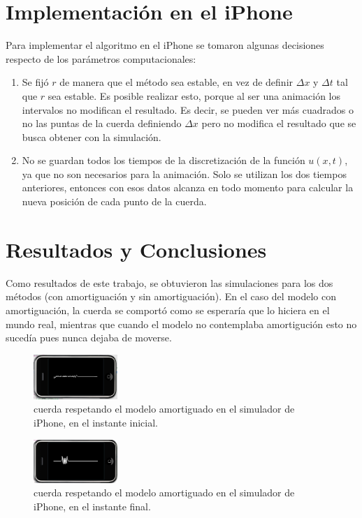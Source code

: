 \documentclass[11pt,a4paper]{emulateapj}
\begin{document}
\section{Implementación en el iPhone}
Para implementar el algoritmo en el iPhone se tomaron algunas decisiones respecto de los parámetros computacionales:
\begin{enumerate}
	\item Se fijó $r$ de manera que el método sea estable, en vez de definir $\Delta x$ y $\Delta t$ tal que $r$ sea estable. Es posible realizar esto, porque al ser una animación los intervalos no modifican el resultado. Es decir, se pueden ver más cuadrados o no las puntas de la cuerda definiendo $\Delta x$ pero no modifica el resultado que se busca obtener con la simulación.
	\item No se guardan todos los tiempos de la discretización de la función $u(x,t)$, ya que no son necesarios para la animación. Solo se utilizan los dos tiempos anteriores, entonces con esos datos alcanza en todo momento para calcular la nueva posición de cada punto de la cuerda.
\end{enumerate}
\section{Resultados y Conclusiones}
\label{sec:resultadosyconclusiones}

Como resultados de este trabajo, se obtuvieron las simulaciones para los dos métodos (con amortiguación y sin amortiguación). En el caso del modelo con amortiguación, la cuerda se comportó como se esperaría que lo hiciera en el mundo real, mientras que cuando el modelo no contemplaba amortigución esto no sucedía pues nunca dejaba de moverse.  
\begin{figure}[ht!]
     \includegraphics[width=120px]{images/amortInit.png}
      \caption{cuerda respetando el modelo amortiguado en el simulador de iPhone, en el instante inicial.}
     \label{fig:amortInit}
\end{figure} 
\begin{figure}[ht!]
     \includegraphics[width=120px]{images/amortFinal.png}
      \caption{cuerda respetando el modelo amortiguado en el simulador de iPhone, en el instante final.}
     \label{fig:amortFinal}
\end{figure}
 
\end{document}
